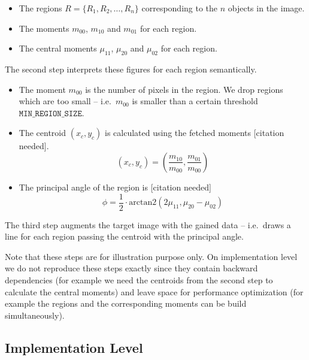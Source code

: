 \documentclass[letter,12pt]{article}
\begin{document}
\begin{itemize}
\item The regions $R = \{R_1, R_2,\ldots, R_n\}$ corresponding to the $n$ objects in the image.
\item The moments $m_{00}$, $m_{10}$ and $m_{01}$ for each region.
\item The central moments $\mu_{11}$, $\mu_{20}$ and $\mu_{02}$ for each region.
\end{itemize}

The second step interprets these figures for each region semantically.

\begin{itemize}
\item The moment $m_{00}$ is the number of pixels in the region. We drop regions which are too small -- i.e.\ $m_{00}$ is smaller than a certain threshold $\mathtt{MIN\_REGION\_SIZE}$.
\item The centroid $(x_c,y_c)$ is calculated using the fetched moments [citation needed].
\begin{equation*}
(x_c,y_c) = (\frac{m_{10}}{m_{00}},\frac{m_{01}}{m_{00}})
\end{equation*}
\item The principal angle of the region is [citation needed]
\begin{equation*}
\phi = \frac{1}{2}\cdot \text{arctan2}(2\mu_{11},\mu_{20}-\mu_{02})
\end{equation*}
\end{itemize}

The third step augments the target image with the gained data -- i.e.\ draws a line for each region passing the centroid with the principal angle.

Note that these steps are for illustration purpose only. On implementation level we do not reproduce these steps exactly since they contain backward dependencies (for example we need the centroids from the second step to calculate the central moments) and leave space for performance optimization (for example the regions and the corresponding moments can be build simultaneously).

\subsection{Implementation Level}
\end{document}
